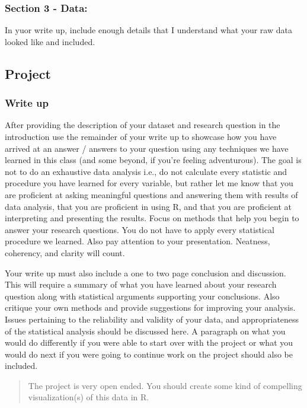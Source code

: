 \documentclass[
]{book}
\begin{document}
\hypertarget{section-3---data}{%
\subsubsection{Section 3 - Data:}\label{section-3---data}}

In yuor write up, include enough details that I understand what your raw data looked like
and included.

\hypertarget{project}{%
\subsection{Project}\label{project}}

\hypertarget{write-up}{%
\subsubsection{Write up}\label{write-up}}

After providing the description of your dataset and research question in the
introduction use the remainder of your write up to showcase how you have arrived at
an answer / answers to your question using any techniques we have learned in this
class (and some beyond, if you're feeling adventurous). The goal is not to do an exhaustive
data analysis i.e., do not calculate every statistic and procedure you have
learned for every variable, but rather let me know that you are proficient at
asking meaningful questions and answering them with results of data analysis, that
you are proficient in using R, and that you are proficient at interpreting and
presenting the results. Focus on methods that help you begin to answer your research
questions. You do not have to apply every statistical procedure we learned.
Also pay attention to your presentation. Neatness, coherency, and clarity will count.

Your write up must also include a one to two page conclusion and discussion.
This will require a summary of what you have learned about your research
question along with statistical arguments supporting your conclusions. Also
critique your own methods and provide suggestions for improving your analysis.
Issues pertaining to the reliability and validity of your data, and
appropriateness of the statistical analysis should be discussed here. A
paragraph on what you would do differently if you were able to start over
with the project or what you would do next if you were going to continue
work on the project should also be included.

\begin{quote}
The project is very open ended. You should create some kind of compelling
visualization(s) of this data in R.
\end{quote}
\end{document}
